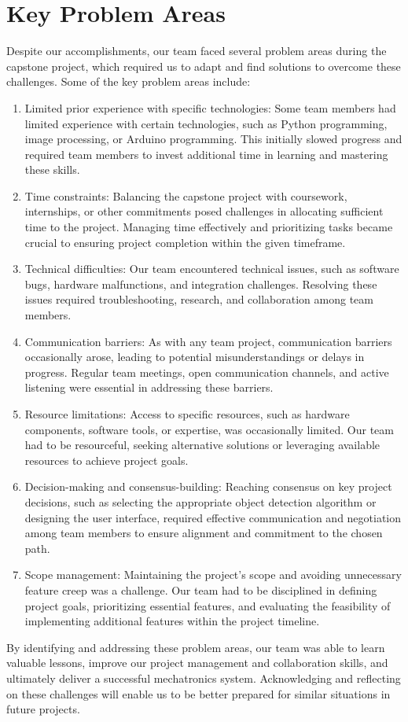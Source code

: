 \documentclass{article}
\begin{document}
\section{Key Problem Areas}
Despite our accomplishments, our team faced several problem areas during the capstone project, which required us to adapt and find solutions to overcome these challenges. Some of the key problem areas include:
\begin{enumerate}
    \item Limited prior experience with specific technologies: Some team members had limited experience with certain technologies, such as Python programming, image processing, or Arduino programming. This initially slowed progress and required team members to invest additional time in learning and mastering these skills.
    \item Time constraints: Balancing the capstone project with coursework, internships, or other commitments posed challenges in allocating sufficient time to the project. Managing time effectively and prioritizing tasks became crucial to ensuring project completion within the given timeframe.
    \item Technical difficulties: Our team encountered technical issues, such as software bugs, hardware malfunctions, and integration challenges. Resolving these issues required troubleshooting, research, and collaboration among team members.
    \item Communication barriers: As with any team project, communication barriers occasionally arose, leading to potential misunderstandings or delays in progress. Regular team meetings, open communication channels, and active listening were essential in addressing these barriers.
    \item Resource limitations: Access to specific resources, such as hardware components, software tools, or expertise, was occasionally limited. Our team had to be resourceful, seeking alternative solutions or leveraging available resources to achieve project goals.
    \item Decision-making and consensus-building: Reaching consensus on key project decisions, such as selecting the appropriate object detection algorithm or designing the user interface, required effective communication and negotiation among team members to ensure alignment and commitment to the chosen path.
    \item Scope management: Maintaining the project's scope and avoiding unnecessary feature creep was a challenge. Our team had to be disciplined in defining project goals, prioritizing essential features, and evaluating the feasibility of implementing additional features within the project timeline.
\end{enumerate}
By identifying and addressing these problem areas, our team was able to learn valuable lessons, improve our project management and collaboration skills, and ultimately deliver a successful mechatronics system. Acknowledging and reflecting on these challenges will enable us to be better prepared for similar situations in future projects.
\end{document}
